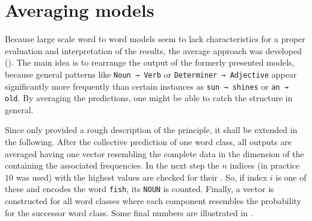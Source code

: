 \section{Averaging models} \label{sec: average approach}
Because large scale word to word models seem to lack characteristics for a proper evaluation and interpretation of the results, the average approach was developed (). The main idea is to rearrange the output of the formerly presented models, because general patterns like \texttt{Noun → Verb} or \texttt{Determiner → Adjective} appear significantly more frequently than certain instances as \texttt{sun → shines} or \texttt{an → old}. By averaging the predictions, one might be able to catch the structure in general.

Since  only provided a rough description of the principle, it shall be extended in the following. After the collective prediction of one word class, all outputs are averaged having one vector resembling the complete data in the dimension of the \cognitiveroom{} containing the associated frequencies. In the next step the $ n $ indices (in practice $ 10 $ was used) with the highest values are checked for their \postag{}. So, if index $ i $ is one of these and encodes the word \texttt{fish}, its \postag{} \ie \texttt{NOUN} is counted. Finally, a vector is constructed for all word classes where each component resembles the probability for the successor word class. Some final numbers are illustrated in \figref{\ref{fig: barplot det adp}}.

